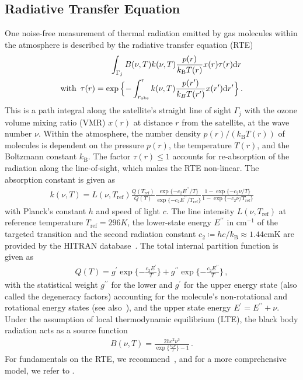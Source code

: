 \documentclass{article}
\begin{document}
\subsection{Radiative Transfer Equation}
\label{sec:RTE}
One noise-free measurement of thermal radiation emitted by gas molecules within the atmosphere is described by the radiative transfer equation (RTE)~\cite{mipas2000handbook}
\begin{align}
	\label{eq:RTE} 
	  \int_{\Gamma_j}  B(\nu,T) k(\nu, T)   \frac{p(r)}{k_{\text{B}} T(r)}  x(r)  \tau(r) \text{d}r \,  \\
\text{with } \,	\tau(r) = \exp{ \Bigl\{ - \int^{r}_{r_\text{obs}}  k(\nu, T)   \frac{p(r^{\prime})}{k_B T(r^{\prime})}  x(r^{\prime}) \text{d}r^{\prime} \Bigr\} } \, \label{eq:absRTE} .
\end{align}
This is a path integral along the satellite's straight line of sight $\Gamma_j$ with the ozone volume mixing ratio (VMR) $x(r)$ at distance $r$ from the satellite, at the wave number $\nu$.
Within the atmosphere, the number density $p(r) / (k_{\text{B}} T(r))$ of molecules is dependent on the pressure $p(r)$, the temperature $T(r)$, and the Boltzmann constant $k_{\text{B}}$.
The factor $\tau(r)\leq 1$ accounts for re-absorption of the radiation along the line-of-sight, which makes the RTE non-linear.
The absorption constant is given as
\begin{align}
	k(\nu, T) = L(\nu, T_{\text{ref}}) \frac{Q(T_{\text{ref}})}{Q(T)} \frac{ \exp{\{ - c_2 E^{\prime \prime} / T\}} }{\exp{\{ - c_2 E^{\prime \prime} / T_{\text{ref}} \}}} \frac{ 1- \exp{\{ - c_2 \nu  / T \}} }{1 - \exp{\{ - c_2 \nu / T_{\text{ref}} \}}}
\end{align}
with Planck's constant $h$ and speed of light $c$.
The line intensity $L(\nu, T_{\text{ref}})$ at reference temperature $T_{\text{ref}} =296K $, the lower-state energy $ E^{\prime \prime} $ in $\text{cm}^{-1}$ of the targeted transition and the second radiation constant $c_2\coloneqq hc/k_{\text{B}} \approx 1.44\text{cmK}$ are provided by the HITRAN database~\cite{gordon2022hitran2020}.
The total internal partition function is given as
\begin{align}
	Q(T )= g^{ \prime} \exp{\{ - \frac{ c_2 E^{ \prime} }{T}\}} + g^{\prime \prime} \exp{\{ - \frac{ c_2 E^{\prime \prime} }{T}\}} \, ,
\end{align}
with the statistical weight $ g^{\prime \prime}$ for the lower and $ g^{ \prime}$ for the upper energy state (also called the degeneracy factors) accounting for the molecule's non-rotational and rotational energy states (see also~\cite{vsimevckova2006einstein}), and the upper state energy $E^{ \prime} = E^{ \prime\prime} + \nu$.
Under the assumption of local thermodynamic equilibrium (LTE), the black body radiation acts as a source function
\begin{align}
	B(\nu,T)   = \frac{2 h c^2 \nu^3}{\exp{\{\frac{c_2\nu}{ T}\}}-1}\, .
\end{align}
For fundamentals on the RTE, we recommend~\cite[Chapter 1]{rybicki2000rte}, and for a more comprehensive model, we refer to \cite{read2006forwardModel}.
\end{document}
